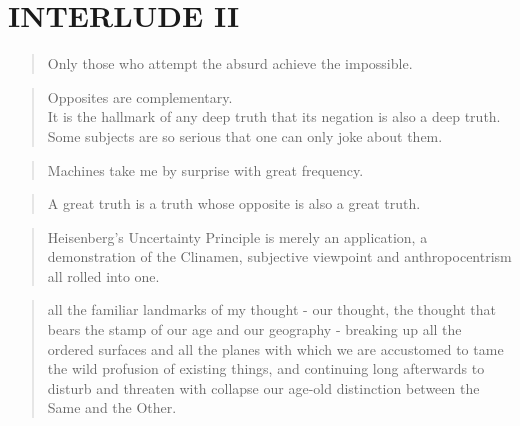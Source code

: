 
\pagestyle{empty}

\chapter*{INTERLUDE II}
\label{interlude2}


\begin{quotation}
    Only those who attempt the absurd achieve the impossible. 
\end{quotation}

\begin{quotation}
  Opposites are complementary.\\
  It is the hallmark of any deep truth that its negation is also a deep truth.\\
  Some subjects are so serious that one can only joke about them.
\end{quotation}

\begin{quotation}
    Machines take me by surprise with great frequency.
\end{quotation}

\begin{quotation}
    A great truth is a truth whose opposite is also a great truth. 
\end{quotation}

\begin{quotation}
    Heisenberg's Uncertainty Principle is merely an application, a demonstration of the Clinamen, subjective viewpoint and anthropocentrism all rolled into one. 
\end{quotation}

\begin{quotation}
  all the familiar landmarks of my thought - our thought, the thought that bears the stamp of our age and our geography - breaking up all the ordered surfaces and all the planes with which we are accustomed to tame the wild profusion of existing things, and continuing long afterwards to disturb and threaten with collapse our age-old distinction between the Same and the Other. 
\end{quotation}


\pagestyle{fania}


\clearpage